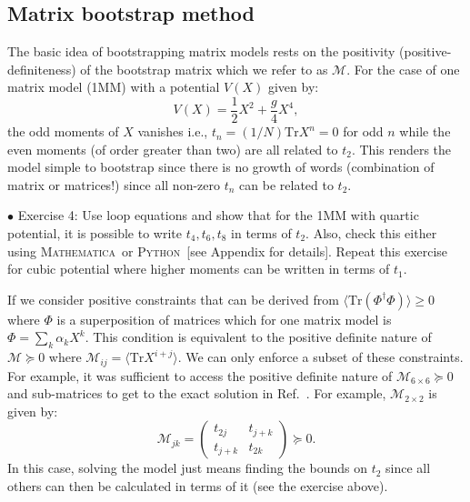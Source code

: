 \documentclass[letter,11pt]{article}
\newcommand{\MA}{\textsc{Mathematica}}
\newcommand{\PY}{\textsc{Python}}
\begin{document}
\subsection{Matrix bootstrap method}
The basic idea of bootstrapping matrix models rests on the 
positivity (positive-definiteness) of the bootstrap matrix which we refer to as $\mathcal{M}$. 
For the case of one matrix model (1MM) with a potential $V(X)$ given by: 
\begin{equation}
    V(X) = \frac12 X^2 + \frac{g}{4} X^4, 
\end{equation}
the odd moments of $X$ vanishes i.e., $ t_{n} = (1/N)\mbox{Tr} X^n = 0$ for odd $n$
while the even moments (of order greater than two) are all related to $t_{2}$. This renders the 
model simple to bootstrap since there is no growth of words (combination of matrix or matrices!)
since all non-zero $t_{n}$ can be related to $t_{2}$. 
\begin{mdframed}[backgroundcolor=blue!3] 
	$\bullet$ Exercise 4: Use loop equations and show that for the 1MM with quartic potential, it is possible to write $t_{4}, t_{6}, t_{8}$ in terms of $t_{2}$. Also, check this either using \MA~or  \PY~[see Appendix for details]. 
Repeat this exercise for cubic potential where higher moments can be written in terms of $t_1$.  
\end{mdframed} 
If we consider positive constraints that can be derived from $\langle \mbox{Tr}(\Phi^{\dagger}\Phi) \rangle \ge 0 $
where $\Phi$ is a superposition of matrices which for one matrix model is 
$ \Phi = \sum_{k} \alpha_{k} X^{k}$. This condition is equivalent to the positive definite nature of
$\mathcal{M} \succeq 0 $ where $ \mathcal{M}_{ij} = \langle \mbox{Tr} X^{i+j} \rangle$. 
We can only enforce a subset of these constraints. For example, it was sufficient to 
access the positive definite nature of $\mathcal{M}_{6 \times 6} \succeq 0 $ 
and sub-matrices to get to the exact solution in Ref.~\cite{Lin:2020mme}. 
For example, $\mathcal{M}_{2 \times 2}$ is given by:
\begin{equation}
	\mathcal{M}_{jk} = 
	\begin{pmatrix}
		t_{2j} & t_{j+k}  \\
		t_{j+k} & t_{2k}  
	\end{pmatrix}  \succeq 0. 
\end{equation}
In this case, solving the model just means finding the bounds on $t_{2}$ 
since all others can then be calculated in terms of it (see the exercise above). 
\end{document}
